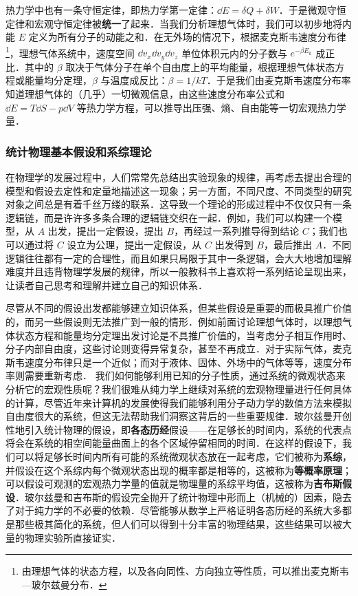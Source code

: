热力学中也有一条守恒定律，即热力学第一定律：$\dd E=\delta Q+\delta W$．于是微观守恒定律和宏观守恒定律被\textbf{统一}了起来．当我们分析理想气体时，我们可以初步地将内能 $E$ 定义为所有分子的动能之和．在无外场的情况下，根据麦克斯韦速度分布律\footnote{由理想气体的状态方程，以及各向同性、方向独立等性质，可以推出麦克斯韦—玻尔兹曼分布．}，理想气体系统中，速度空间 $\dd v_x\dd v_y\dd v_z$ 单位体积元内的分子数与 $e^{-\beta E_k}$ 成正比．其中的 $\beta$ 取决于气体分子在单个自由度上的平均能量，根据理想气体状态方程或能量均分定理，$\beta$ 与温度成反比：$\beta=1/kT$．于是我们由麦克斯韦速度分布率知道理想气体的（几乎）一切微观信息，由这些速度分布率公式和 $\dd E=T\dd S-p\dd V$ 等热力学方程，可以推导出压强、熵、自由能等一切宏观热力学量．
\subsubsection{统计物理基本假设和系综理论}
在物理学的发展过程中，人们常常先总结出实验现象的规律，再考虑去提出合理的模型和假设去定性和定量地描述这一现象；另一方面，不同尺度、不同类型的研究对象之间总是有着千丝万缕的联系．这导致一个理论的形成过程中不仅仅只有一条逻辑链，而是许许多多条合理的逻辑链交织在一起．例如，我们可以构建一个模型，从 $A$ 出发，提出一定假设，提出 $B$，再经过一系列推导得到结论 $C$；我们也可以通过将 $C$ 设立为公理，提出一定假设，从 $C$ 出发得到 $B$，最后推出 $A$．不同逻辑往往都有一定的合理性，而且如果只局限于其中一条逻辑，会大大地增加理解难度并且违背物理学发展的规律，所以一般教科书上喜欢将一系列结论呈现出来，让读者自己思考和理解并建立自己的知识体系．

尽管从不同的假设出发都能够建立知识体系，但某些假设是重要的而极具推广价值的，而另一些假设则无法推广到一般的情形．例如前面讨论理想气体时，以理想气体状态方程和能量均分定理出发讨论是不具推广价值的，当考虑分子相互作用时、分子内部自由度，这些讨论则变得异常复杂，甚至不再成立．对于实际气体，麦克斯韦速度分布律只是一个近似；而对于液体、固体、外场中的气体等等，速度分布率则需要重新考虑． 我们如何能够利用已知的分子性质，通过系统的微观状态来分析它的宏观性质呢？我们很难从纯力学上继续对系统的宏观物理量进行任何具体的计算，尽管近年来计算机的发展使得我们能够利用分子动力学的数值方法来模拟自由度很大的系统，但这无法帮助我们洞察这背后的一些重要规律．玻尔兹曼开创性地引入统计物理的假设，即\textbf{各态历经}假设——在足够长的时间内，系统的代表点将会在系统的相空间能量曲面上的各个区域停留相同的时间．在这样的假设下，我们可以将足够长时间内所有可能的系统微观状态放在一起考虑，它们被称为\textbf{系综}，并假设在这个系综内每个微观状态出现的概率都是相等的，这被称为\textbf{等概率原理}；可以假设可观测的宏观热力学量的值就是物理量的系综平均值，这被称为\textbf{吉布斯假设}．玻尔兹曼和吉布斯的假设完全抛开了统计物理中形而上（机械的）因素，隐去了对于纯力学的不必要的依赖．尽管能够从数学上严格证明各态历经的系统大多都是那些极其简化的系统，但人们可以得到十分丰富的物理结果，这些结果可以被大量的物理实验所直接证实．


